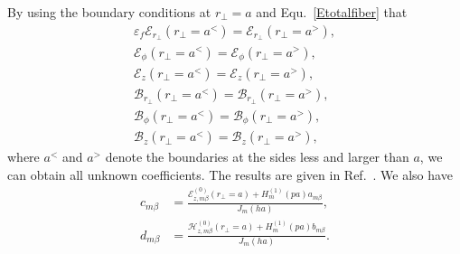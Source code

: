 \documentclass[]{report}
\begin{document}
By using the boundary conditions at $ r\!_\perp=a $ and Equ.~\ref{Etotalfiber} that
\begin{align}
\varepsilon_f \mathcal{E}_{r\!_\perp}(r\!_\perp =a^< ) = \mathcal{E}_{r\!_\perp}(r\!_\perp =a^> ),\\
\mathcal{E}_{\phi}(r\!_\perp =a^< ) = \mathcal{E}_{\phi}(r\!_\perp =a^> ),\\
\mathcal{E}_{z}(r\!_\perp =a^< ) = \mathcal{E}_{z}(r\!_\perp =a^> ),\\
\mathcal{B}_{r\!_\perp}(r\!_\perp =a^< ) = \mathcal{B}_{r\!_\perp}(r\!_\perp =a^> ),\\
\mathcal{B}_{\phi}(r\!_\perp =a^< ) = \mathcal{B}_{\phi}(r\!_\perp =a^> ),\\
\mathcal{B}_{z}(r\!_\perp =a^< ) = \mathcal{B}_{z}(r\!_\perp =a^> ),
\end{align}
where $ a^< $ and $ a^> $ denote the boundaries at the sides less and larger than $ a $, we can obtain all unknown coefficients. The results are given in Ref.~\cite{Klimov2004}. We also have
\begin{align}
c_{m\beta} &= \frac{\mathcal{E}_{z,m\beta}^{(0)}(r\!_\perp\!=\!a)+ H_m^{(1)}(pa)a_{m\beta}}{J_m(ha)},\\
d_{m\beta} &= \frac{\mathcal{H}_{z,m\beta}^{(0)}(r\!_\perp\!=\!a)+ H_m^{(1)}(pa)b_{m\beta}}{J_m(ha)}.
\end{align}
\end{document}
